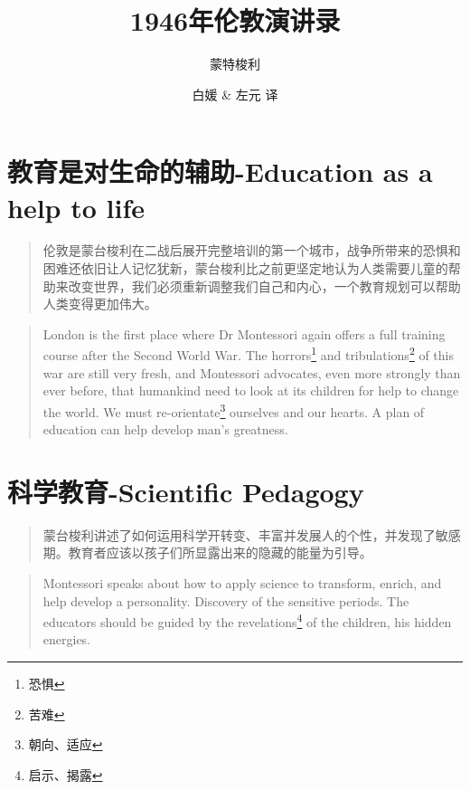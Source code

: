\documentclass[lang=cn,10pt]{elegantbook}
\title{1946年伦敦演讲录}
\subtitle{蒙特梭利}
\author{白媛 \& 左元 译}
\begin{document}
\maketitle
\frontmatter

\tableofcontents

\mainmatter

\chapter{教育是对生命的辅助-Education as a help to life}

\begin{quote}
{\small 伦敦是蒙台梭利在二战后展开完整培训的第一个城市，战争所带来的恐惧和困难还依旧让人记忆犹新，蒙台梭利比之前更坚定地认为人类需要儿童的帮助来改变世界，我们必须重新调整我们自己和内心，一个教育规划可以帮助人类变得更加伟大。}
\end{quote}

\begin{tcolorbox}
\begin{quote}
{\small London is the first place where Dr Montessori again offers a full training course after the Second World War. The horrors\footnote{恐惧} and tribulations\footnote{苦难} of this war are still very fresh, and Montessori advocates, even more strongly than ever before, that humankind need to look at its children for help to change the world. We must re-orientate\footnote{朝向、适应} ourselves and our hearts. A plan of education can help develop man's greatness.}
\end{quote}
\end{tcolorbox}

\chapter{科学教育-Scientific Pedagogy}

\begin{quote}
{\small 蒙台梭利讲述了如何运用科学开转变、丰富并发展人的个性，并发现了敏感期。教育者应该以孩子们所显露出来的隐藏的能量为引导。}
\end{quote}

\begin{tcolorbox}
\begin{quote}
{\small Montessori speaks about how to apply science to transform, enrich, and help develop a personality. Discovery of the sensitive periods. The educators should be guided by the revelations\footnote{启示、揭露} of the children, his hidden energies.}
\end{quote}
\end{tcolorbox}
\end{document}
